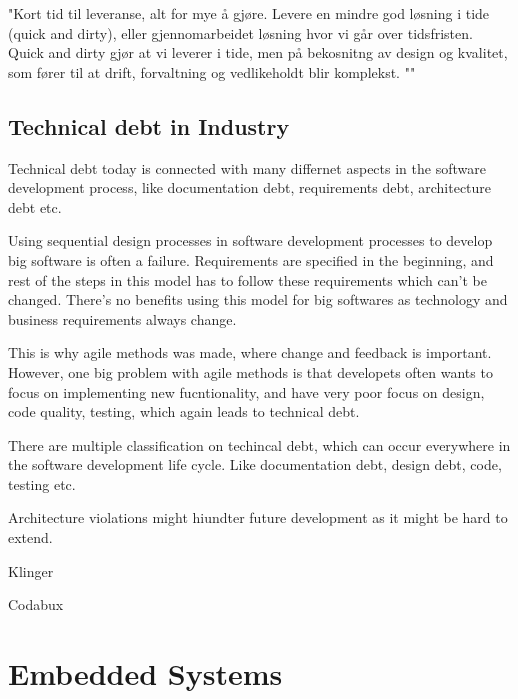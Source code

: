 "Kort tid til leveranse, alt for mye å gjøre. Levere en mindre god løsning i tide (quick and dirty), eller gjennomarbeidet løsning hvor vi går over tidsfristen. Quick and dirty gjør at vi leverer i tide, men på bekosnitng av design og kvalitet, som fører til at drift, forvaltning og vedlikeholdt blir komplekst. ""



\section{Technical debt in Industry}
Technical debt today is connected with many differnet aspects in the software development process, like documentation debt, requirements debt, architecture debt etc. 

Using sequential design processes in software development processes to develop big software is often a failure. Requirements are specified in the beginning, and rest of the steps in this model has to follow these requirements which can't be changed. There's no benefits using this model for big softwares as technology and business requirements always change. 

This is why agile methods was made, where change and feedback is important. However, one big problem with agile methods is that developets often wants to focus on implementing new fucntionality, and have very poor focus on design, code quality, testing, which again leads to technical debt. 

There are multiple classification on techincal debt, which can occur everywhere in the software development life cycle. Like documentation debt, design debt, code, testing etc. 

Architecture violations might hiundter future development as it might be hard to extend.



Klinger

Codabux




























\chapter{Embedded Systems}
